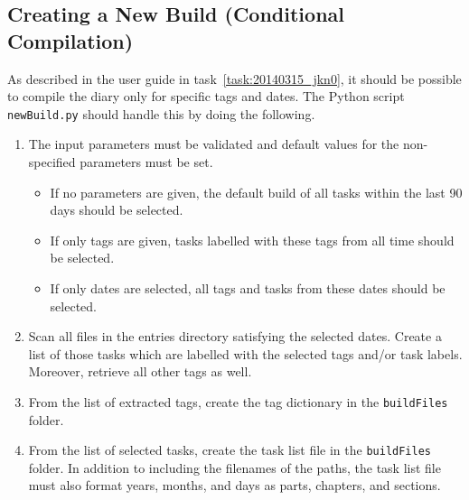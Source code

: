\subsection{Creating a New Build (Conditional Compilation)}
\label{task:20140324_jkn0}
As described in the user guide in task~\ref{task:20140315_jkn0}, it should be possible to compile the diary only for specific tags and dates. The Python script {\tt newBuild.py} should handle this by doing the following.
\begin{enumerate}
    \item The input parameters must be validated and default values for the non-specified parameters must be set.
    \begin{itemize}
        \item If no parameters are given, the default build of all tasks within the last 90 days should be selected.
        \item If only tags are given, tasks labelled with these tags from all time should be selected.
        \item If only dates are selected, all tags and tasks from these dates should be selected.
    \end{itemize}
    \item Scan all files in the entries directory satisfying the selected dates. Create a list of those tasks which are labelled with the selected tags and/or task labels. Moreover, retrieve all other tags as well.
    \item From the list of extracted tags, create the tag dictionary in the {\tt buildFiles} folder.
    \item From the list of selected tasks, create the task list file in the {\tt buildFiles} folder. In addition to including the filenames of the paths, the task list file must also format years, months, and days as parts, chapters, and sections.
\end{enumerate}
